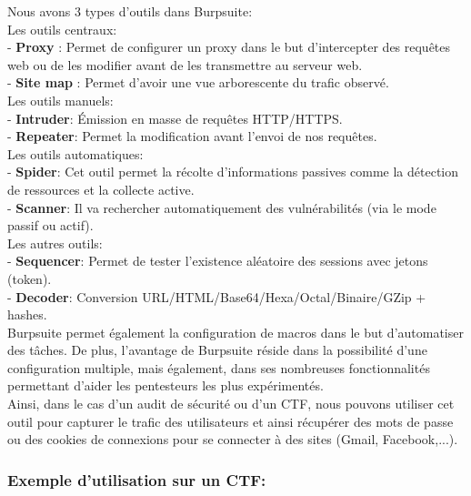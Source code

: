  Nous avons 3 types d’outils dans Burpsuite:\\

 Les outils centraux:\\
- \textbf{Proxy} : Permet de configurer un proxy dans le but d’intercepter des requêtes web ou de les modifier avant de les transmettre au serveur web.\\
- \textbf{Site map} : Permet d’avoir une vue arborescente du trafic observé.\\


 Les outils manuels:\\
- \textbf{Intruder}: Émission en masse de requêtes HTTP/HTTPS.\\
- \textbf{Repeater}: Permet la modification avant l’envoi de nos requêtes.\\

 Les outils automatiques:\\
- \textbf{Spider}: Cet outil permet la récolte d’informations passives comme la détection de ressources et la collecte active.\\
- \textbf{Scanner}: Il va rechercher automatiquement des vulnérabilités (via le mode passif ou actif).\\

 Les autres outils:\\
- \textbf{Sequencer}: Permet de  tester l'existence aléatoire des sessions avec jetons (token).\\
- \textbf{Decoder}: Conversion URL/HTML/Base64/Hexa/Octal/Binaire/GZip + hashes.\\

Burpsuite permet également la configuration de macros dans le but d’automatiser des tâches. De plus, l’avantage de Burpsuite réside dans la possibilité d’une configuration multiple, mais également, dans ses nombreuses fonctionnalités permettant d’aider les pentesteurs les plus expérimentés.\\

Ainsi, dans le cas d’un audit de sécurité ou d’un CTF, nous pouvons utiliser cet outil pour capturer le trafic des utilisateurs et ainsi récupérer des mots de passe ou des cookies de connexions pour se connecter à des sites (Gmail, Facebook,...).\\

\subsubsection{Exemple d’utilisation sur un CTF:}

